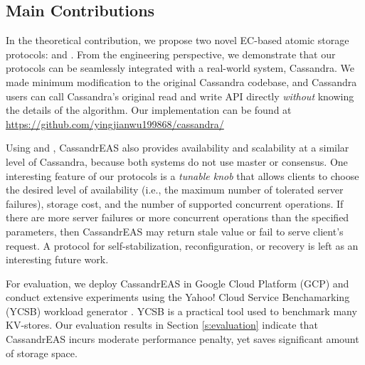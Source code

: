 \subsection*{Main Contributions}
In the theoretical contribution, we propose two novel EC-based atomic storage protocols: \treasmod{} and \oreas. From the engineering perspective, we demonstrate that our protocols can be seamlessly integrated with a real-world system, Cassandra. We made minimum modification to the original Cassandra codebase, and Cassandra users can call Cassandra's original read and write API directly \textit{without} knowing the details of the algorithm.
Our implementation can be found at \url{https://github.com/yingjianwu199868/cassandra/}

Using \treasmod{} and \oreas{}, CassandrEAS also provides availability and scalability at a similar level of Cassandra, because both systems do not use master or consensus.
One interesting feature of our protocols is a \textit{tunable knob} that allows clients to choose the desired level of availability (i.e., the maximum number of tolerated server failures), storage cost, and the number of supported concurrent operations. If there are more server failures or more concurrent operations than the specified parameters, then CassandrEAS may return stale value or fail to serve client's request. A protocol for self-stabilization, reconfiguration, or recovery is left as an interesting future work.

For evaluation, we deploy CassandrEAS in Google Cloud Platform (GCP) and conduct extensive experiments using the Yahoo! Cloud Service Benchamarking (YCSB) workload generator \cite{YCSB:2010}. YCSB is a practical tool used to benchmark many KV-stores.
Our evaluation results in Section \ref{s:evaluation} indicate that CassandrEAS incurs moderate performance penalty, yet saves significant amount of storage space.

